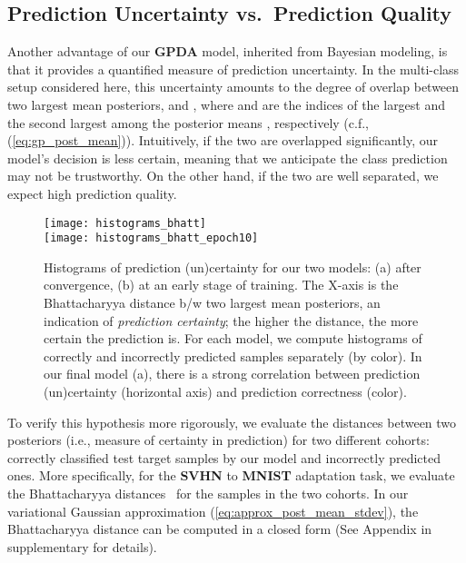 \documentclass[10pt,letterpaper]{article}
\begin{document}
\subsection{Prediction Uncertainty vs.~Prediction Quality}

Another advantage of our \textbf{GPDA} model, inherited from Bayesian modeling, is that it provides a quantified measure of prediction uncertainty. In the multi-class setup considered here, this uncertainty amounts to the degree of overlap between two largest mean posteriors,   and , where  and  are the indices of the largest and the second largest among the posterior means , respectively (c.f., (\ref{eq:gp_post_mean})). Intuitively, if the two are overlapped significantly, our model's decision is less certain, meaning that we anticipate the class prediction may not be trustworthy. On the other hand, if the two are well separated, we expect high prediction quality. 

\begin{figure}[t!]
\begin{center}
\texttt{[image: histograms\_bhatt]} \\
\vspace{+0.2em}
\texttt{[image: histograms\_bhatt\_epoch10]}
\end{center}
\vspace{-1.7em}
\caption{Histograms of prediction (un)certainty for our two models: (a) after convergence, (b) at an early stage of training. The X-axis is the Bhattacharyya distance b/w two largest mean posteriors, an indication of {\em prediction certainty}; the higher the distance, the more certain the prediction is. For each model, we compute histograms of correctly and incorrectly predicted samples separately (by color). In our final model (a), there is a strong correlation between prediction (un)certainty (horizontal axis) and prediction correctness (color).}
\label{fig:uncertainty}
\end{figure}

To verify this hypothesis more rigorously, we evaluate the distances between two posteriors (i.e., measure of certainty in prediction) for two different cohorts: correctly classified test target samples by our model and incorrectly predicted ones. More specifically, for the \textbf{SVHN} to \textbf{MNIST} adaptation task, we evaluate the Bhattacharyya distances~\cite{derpanis2008bhattacharyya} for the samples in the two cohorts. In our variational Gaussian approximation (\ref{eq:approx_post_mean_stdev}), the Bhattacharyya distance can be computed in a closed form (See Appendix in supplementary for details). 
\end{document}
